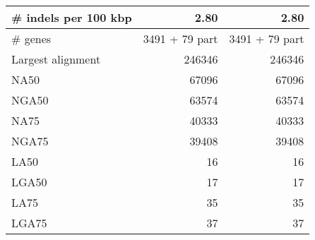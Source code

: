 \documentclass[12pt,a4paper]{article}
\begin{document}
\begin{table}[ht]
\begin{center}
\begin{tabular}{|l*{2}{|r}|}
\# indels per 100 kbp & 2.80 & 2.80 \\ \hline
\# genes & 3491 + 79 part & 3491 + 79 part \\ \hline
Largest alignment & 246346 & 246346 \\ \hline
NA50 & 67096 & 67096 \\ \hline
NGA50 & 63574 & 63574 \\ \hline
NA75 & 40333 & 40333 \\ \hline
NGA75 & 39408 & 39408 \\ \hline
LA50 & 16 & 16 \\ \hline
LGA50 & 17 & 17 \\ \hline
LA75 & 35 & 35 \\ \hline
LGA75 & 37 & 37 \\ \hline
\end{tabular}
\end{center}
\end{table}
\end{document}
